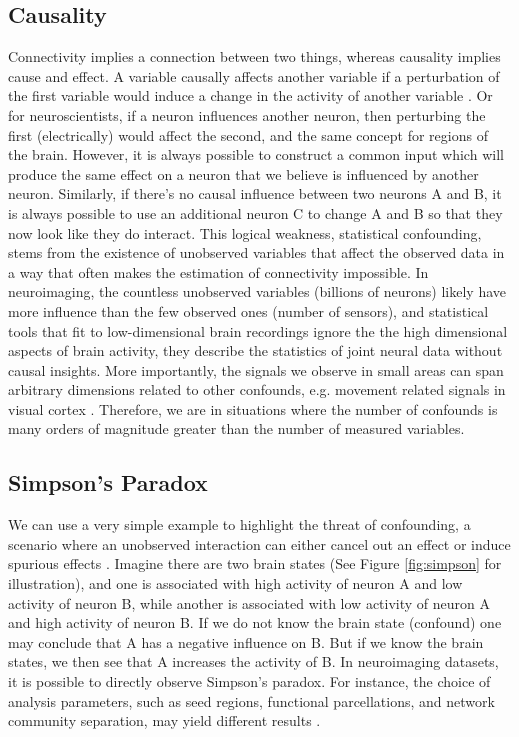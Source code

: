 \subsection{Causality}
Connectivity implies a connection between two things, whereas causality implies cause and effect. A variable causally affects another variable if a perturbation of the first variable would induce a change in the activity of another variable \cite{pearl_causality_2000}. Or for neuroscientists, if a neuron influences another neuron, then perturbing the first (electrically) would affect the second, and the same concept for regions of the brain. However, it is always possible to construct a common input which will produce the same effect on a neuron that we believe is influenced by another neuron. Similarly, if there's no causal influence between two neurons A and B, it is always possible to use an additional neuron C to change A and B so that they now look like they do interact. This logical weakness, statistical confounding, stems from the existence of unobserved variables that affect the observed data in a way that often makes the estimation of connectivity impossible. In neuroimaging, the countless unobserved variables (billions of neurons) likely have more influence than the few observed ones (number of sensors), and statistical tools that fit to low-dimensional brain recordings ignore the the high dimensional aspects of brain activity, they describe the statistics of joint neural data without causal insights. More importantly, the signals we observe in small areas can span arbitrary dimensions related to other confounds, e.g. movement related signals in visual cortex \cite{musall_movement-related_2018,stringer_spontaneous_2019}. Therefore, we are in situations where the number of confounds is many orders of magnitude greater than the number of measured variables.

\subsection{Simpson's Paradox}
We can use a very simple example to highlight the threat of confounding, a scenario where an unobserved interaction can either cancel out an effect or induce spurious effects \cite{simpson_interpretation_1951}. Imagine there are two brain states (See Figure \ref{fig:simpson} for illustration), and one is associated with high activity of neuron A and low activity of neuron B, while another is associated with low activity of neuron A and high activity of neuron B. If we do not know the brain state (confound) one may conclude that A has a negative influence on B. But if we know the brain states, we then see that A increases the activity of B. In neuroimaging datasets, it is possible to directly observe Simpson's paradox. For instance, the choice of analysis parameters, such as seed regions, functional parcellations, and network community separation, may yield different results \cite{roberts_simpsons_2016,salehi_there_2020}.

